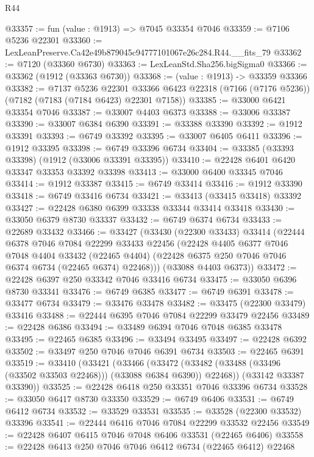 \begin{lexlean}{R44}
\begin{coremodule}
{@33357 := fun (value : @1913) => @7045 @33354 @7046
@33359 := @7106 @5236 @22301
@33360 := LexLeanPreserve.Ca42e49b879045c94777101067e26c284.R44.__fits_79
@33362 := @7120 (@33360 @6730)
@33363 := LexLeanStd.Sha256.bigSigma0
@33366 := @33362 (@1912 (@33363 @6730))
@33368 := (value : @1913) -> @33359 @33366
@33382 := @7137
    @5236
    @22301
    @33366
    @6423
    @22318
    (@7166 (@7176 @5236))
    (@7182 (@7183 (@7184 @6423) @22301 @7158))
@33385 := @33000 @6421 @33354 @7046
@33387 := @33007 @4403 @6373
@33388 := @33006 @33387
@33390 := @33007 @6384 @6390
@33391 := @33388 @33390
@33392 := @1912 @33391
@33393 := @6749 @33392
@33395 := @33007 @6405 @6411
@33396 := @1912 @33395
@33398 := @6749 @33396 @6734
@33404 := @33385 (@33393 @33398) (@1912 (@33006 @33391 @33395))
@33410 := @22428 @6401 @6420 @33347 @33353 @33392 @33398
@33413 := @33000 @6400 @33345 @7046
@33414 := @1912 @33387
@33415 := @6749 @33414
@33416 := @1912 @33390
@33418 := @6749 @33416 @6734
@33421 := @33413 (@33415 @33418) @33392
@33427 := @22428 @6380 @6399 @33338 @33344 @33414 @33418
@33430 := @33050 @6379 @8730 @33337
@33432 := @6749 @6374 @6734
@33433 := @22689 @33432
@33466 := @33427
    (@33430
      (@22300 @33433)
      @33414
      (@22444
        @6378
        @7046
        @7084
        @22299
        @33433
        @22456
        (@22428
          @4405
          @6377
          @7046
          @7048
          @4404
          @33432
          (@22465 @4404)
          (@22428 @6375 @250 @7046 @7046 @6374 @6734 (@22465 @6374) @22468)))
      (@33088 @4403 @6373))
@33472 := @22428 @6397 @250 @33342 @7046 @33416 @6734
@33475 := @33050 @6396 @8730 @33341
@33476 := @6749 @6385
@33477 := @6749 @6391
@33478 := @33477 @6734
@33479 := @33476 @33478
@33482 := @33475 (@22300 @33479) @33416
@33488 := @22444 @6395 @7046 @7084 @22299 @33479 @22456
@33489 := @22428 @6386
@33494 := @33489 @6394 @7046 @7048 @6385 @33478
@33495 := @22465 @6385
@33496 := @33494 @33495
@33497 := @22428 @6392
@33502 := @33497 @250 @7046 @7046 @6391 @6734
@33503 := @22465 @6391
@33519 := @33410
    (@33421
      (@33466
        (@33472 (@33482 (@33488 (@33496 (@33502 @33503 @22468))) (@33088 @6384 @6390)) @22468))
      (@33142 @33387 @33390))
@33525 := @22428 @6418 @250 @33351 @7046 @33396 @6734
@33528 := @33050 @6417 @8730 @33350
@33529 := @6749 @6406
@33531 := @6749 @6412 @6734
@33532 := @33529 @33531
@33535 := @33528 (@22300 @33532) @33396
@33541 := @22444 @6416 @7046 @7084 @22299 @33532 @22456
@33549 := @22428 @6407 @6415 @7046 @7048 @6406 @33531 (@22465 @6406)
@33558 := @22428 @6413 @250 @7046 @7046 @6412 @6734 (@22465 @6412) @22468
}
\end{coremodule}
\end{lexlean}
